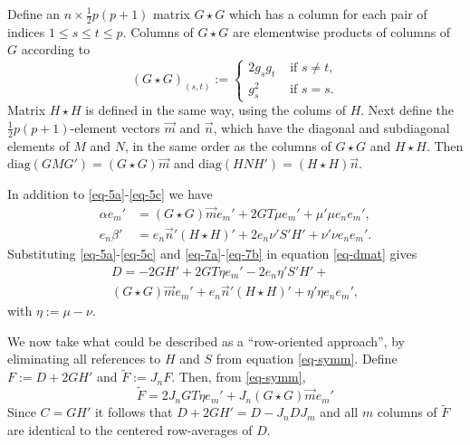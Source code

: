 \documentclass[
  12pt,
  letterpaper,
  DIV=11,
  numbers=noendperiod]{scrartcl}
\begin{document}
Define an \(n \times \frac12 p(p + 1)\) matrix \(G \star G\) which has a
column for each pair of indices \(1 \leq s \leq t \leq p\). Columns of
\(G \star G\) are elementwise products of columns of \(G\) according to
\begin{equation}
  (G \star G)_{(s,t)} := \begin{cases}
                           2g_sg_t & \text{ if }s \neq t, \\
                           g_s^2   & \text{ if }s = s.
                         \end{cases}
\end{equation} Matrix \(H \star H\) is defined in the same way, using
the colums of \(H\). Next define the \(\frac12 p(p + 1)\)-element
vectors \(\overrightarrow{m}\) and \(\overrightarrow{n}\), which have
the diagonal and subdiagonal elements of \(M\) and \(N\), in the same
order as the columns of \(G \star G\) and \(H \star H\). Then
\(\text{diag}(GMG') = (G \star G)\overrightarrow{m}\) and
\(\text{diag}(HNH') = (H \star H)\overrightarrow{n}\).

In addition to \eqref{eq-5a}-\eqref{eq-5c} we have \begin{subequations}
  \begin{align}
    \alpha e_m' & = (G \star G)\overrightarrow{m} e_m' + 2GT\mu e_m' + \mu'\mu e_ne_m',\label{eq-7a}  \\
    e_n\beta'   & = e_n\overrightarrow{n}'(H \star H)' + 2e_n\nu'S'H' + \nu'\nu e_ne_m'.\label{eq-7b}
  \end{align}
\end{subequations} Substituting \eqref{eq-5a}-\eqref{eq-5c} and
\eqref{eq-7a}-\eqref{eq-7b} in equation \eqref{eq-dmat} gives
\begin{multline}
  D = -2GH' + 2GT\eta e_m' - 2e_n\eta'S'H' +                                                                  \\
  (G \star G)\overrightarrow{m} e_m' + e_n\overrightarrow{n}'(H \star H)' + \eta'\eta e_ne_m',\label{eq-symm}
\end{multline} with \(\eta := \mu - \nu\).

We now take what could be described as a ``row-oriented approach'', by
eliminating all references to \(H\) and \(S\) from equation
\eqref{eq-symm}. Define \(F := D + 2GH'\) and \(\tilde F := J_nF\).
Then, from \eqref{eq-symm}, \begin{equation}
  \tilde F = 2J_nGT\eta e_m' + J_n(G \star G)\overrightarrow{m} e_m'\label{eq-feq}
\end{equation} Since \(C = GH'\) it follows that
\(D + 2GH' = D - J_nDJ_m\) and all \(m\) columns of \(\tilde F\) are
identical to the centered row-averages of \(D\).
\end{document}
